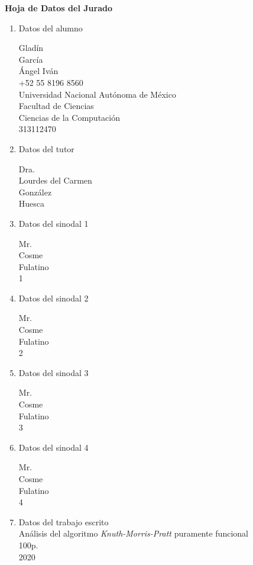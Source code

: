 
\begin{center}
{\large \textbf{Hoja de Datos del Jurado}}
\end{center}
\begin{enumerate}

\item Datos del alumno

Gladín \\
García \\
Ángel Iván \\
+52 55 8196 8560 \\
Universidad Nacional Autónoma de México \\
Facultad de Ciencias \\
Ciencias de la Computación \\
313112470

\item Datos del tutor

Dra. \\
Lourdes del Carmen \\
González \\
Huesca

\item Datos del sinodal 1

Mr. \\
Cosme \\
Fulatino \\
1

\item Datos del sinodal 2

Mr. \\
Cosme \\
Fulatino \\
2

\item Datos del sinodal 3 

Mr. \\
Cosme \\
Fulatino \\
3

\item Datos del sinodal 4

Mr. \\
Cosme \\
Fulatino \\
4

\item Datos del trabajo escrito \\
Análisis del algoritmo \textit{Knuth-Morris-Pratt} puramente funcional \\
100p. \\
2020 

\end{enumerate} 
